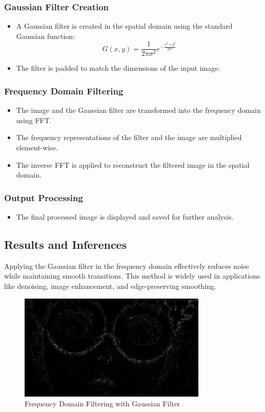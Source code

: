 \documentclass[12pt,a4paper]{article}
\begin{document}
\subsubsection{Gaussian Filter Creation}
\begin{itemize}
  \item A Gaussian filter is created in the spatial domain using the standard Gaussian function:
    \[
      G(x,y) = \frac{1}{2\pi\sigma^2}e^{-\frac{x^2+y^2}{2\sigma^2}}
    \]
  \item The filter is padded to match the dimensions of the input image.
\end{itemize}

\subsubsection{Frequency Domain Filtering}
\begin{itemize}
  \item The image and the Gaussian filter are transformed into the frequency domain using FFT.
  \item The frequency representations of the filter and the image are multiplied element-wise.
  \item The inverse FFT is applied to reconstruct the filtered image in the spatial domain.
\end{itemize}

\subsubsection{Output Processing}
\begin{itemize}
  \item The final processed image is displayed and saved for further analysis.
\end{itemize}

\subsection{Results and Inferences}
Applying the Gaussian filter in the frequency domain effectively reduces noise while maintaining smooth transitions. This method is widely used in applications like denoising, image enhancement, and edge-preserving smoothing.

\begin{figure}[H]
  \centering
  \includegraphics[width=0.8\textwidth]{freq_gaussian/gaussian_filtered_sigma10.jpg}
  \caption{Frequency Domain Filtering with Gaussian Filter}
  \label{fig:gauss_filter}
\end{figure}
\end{document}

